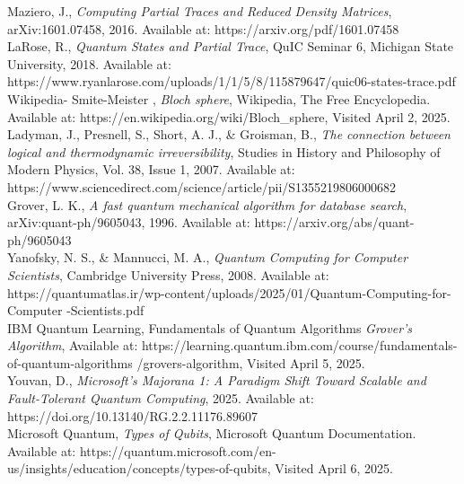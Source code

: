 \noindent[24] Maziero, J., \textit{Computing Partial Traces and Reduced Density Matrices}, arXiv:1601.07458, 2016. Available at: https://arxiv.org/pdf/1601.07458\\

\noindent[25] LaRose, R., \textit{Quantum States and Partial Trace}, QuIC Seminar 6, Michigan State University, 2018. Available at: https://www.ryanlarose.com/uploads/1/1/5/8/115879647/quic06-states-trace.pdf\\

\noindent[26] Wikipedia- Smite-Meister , \textit{Bloch sphere}, Wikipedia, The Free Encyclopedia. Available at: https://en.wikipedia.org/wiki/Bloch\_sphere, Visited April 2, 2025.\\

\noindent[27] Ladyman, J., Presnell, S., Short, A. J., \& Groisman, B., \textit{The connection between logical and thermodynamic irreversibility}, Studies in History and Philosophy of Modern Physics, Vol. 38, Issue 1, 2007. Available at: https://www.sciencedirect.com/science/article/pii/S1355219806000682\\

\noindent[28] Grover, L. K., \textit{A fast quantum mechanical algorithm for database search}, arXiv:quant-ph/9605043, 1996. Available at: https://arxiv.org/abs/quant-ph/9605043\\

\noindent[29] Yanofsky, N. S., \& Mannucci, M. A., \textit{Quantum Computing for Computer Scientists}, Cambridge University Press, 2008. Available at: https://quantumatlas.ir/wp-content/uploads/2025/01/Quantum-Computing-for-Computer
\noindent-Scientists.pdf\\

\noindent[30] IBM Quantum Learning, Fundamentals of Quantum Algorithms \textit{Grover's Algorithm}, Available at: https://learning.quantum.ibm.com/course/fundamentals-of-quantum-algorithms
\noindent/grovers-algorithm, Visited April 5, 2025.\\

\noindent[31] Youvan, D., \textit{Microsoft's Majorana 1: A Paradigm Shift Toward Scalable and Fault-Tolerant Quantum Computing}, 2025. Available at: https://doi.org/10.13140/RG.2.2.11176.89607\\

\noindent[32] Microsoft Quantum, \textit{Types of Qubits}, Microsoft Quantum Documentation. Available at: https://quantum.microsoft.com/en-us/insights/education/concepts/types-of-qubits, Visited April 6, 2025.\\

